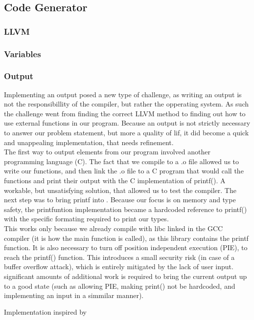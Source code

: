 \subsection{Code Generator}
\label{sec:CodeGenImplement}

\subsubsection{LLVM}


\subsubsection{Variables}


\subsubsection{Output}
Implementing an output posed a new type of challenge, as writing an output is not the responsibillity of the compiler, but rather the opperating system. As such the challenge went from finding the correct LLVM method to finding out how to use external functions in our program. Because an output is not strictly necessary to answer our problem statement, but more a quality of lif, it did become a quick and unappealing implementation, that needs refinement.\\
The first way to output elements from our  program involved another programming language (C). The fact that we compile to a .o file allowed us to write our functions, and then link the .o file to a C program that would call the \lang{} functions and print their output with the C implementation of printf(). A workable, but unsatisfying solution, that allowed us to test the compiler. The next step was to bring printf into \lang. Because our focus is on memory and type safety, the printfuntion implementation became a hardcoded reference to printf() with the specific formating required to print our types.\\
This works only because we already compile with libc linked in the GCC compiler (it is how the main function is called), as this library contains the printf function. It is also necessary to turn off position independent execution (PIE), to reach the printf() function. This introduces a small security risk (in case of a buffer overflow attack), which is entirely mitigated by the lack of user input. significant amounts of additional work is required to bring the current output up to a good state (such as allowing PIE, making print() not be hardcoded, and implementing an input in a simmilar manner).

Implementation inspired by \cite{LLVMTutorial}
